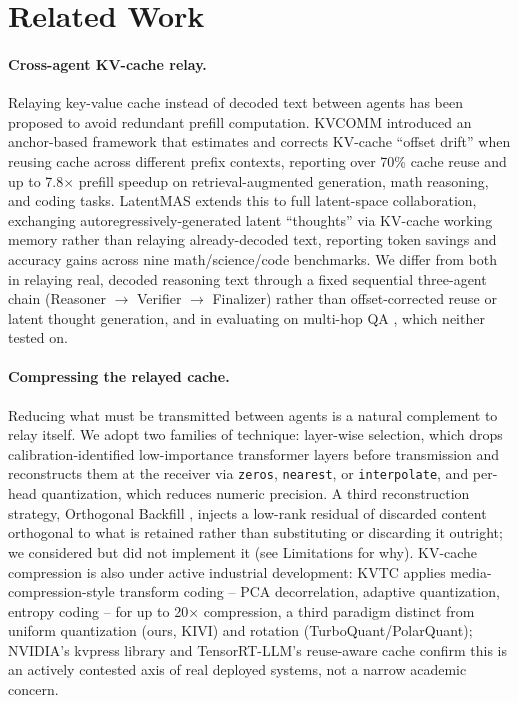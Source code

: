 \documentclass[11pt]{article}
\begin{document}
\section{Related Work}
\label{sec:related}

\paragraph{Cross-agent KV-cache relay.} Relaying key-value cache instead
of decoded text between agents has been proposed to avoid redundant
prefill computation. KVCOMM \citep{kvcomm2025} introduced an anchor-based
framework that estimates and corrects KV-cache ``offset drift'' when
reusing cache across different prefix contexts, reporting over 70\% cache
reuse and up to 7.8$\times$ prefill speedup on retrieval-augmented
generation, math reasoning, and coding tasks. LatentMAS
\citep{latentmas2026} extends this to full latent-space collaboration,
exchanging autoregressively-generated latent ``thoughts'' via KV-cache
working memory rather than relaying already-decoded text, reporting token
savings and accuracy gains across nine math/science/code benchmarks. We
differ from both in relaying real, decoded reasoning text through a fixed
sequential three-agent chain (Reasoner $\rightarrow$ Verifier
$\rightarrow$ Finalizer) rather than offset-corrected reuse or latent
thought generation, and in evaluating on multi-hop QA
\citep{hotpotqa2018}, which neither tested on.

\paragraph{Compressing the relayed cache.} Reducing what must be
transmitted between agents is a natural complement to relay itself. We
adopt two families of technique: layer-wise selection, which drops
calibration-identified low-importance transformer layers before
transmission and reconstructs them at the receiver via \texttt{zeros},
\texttt{nearest}, or \texttt{interpolate}, and per-head quantization,
which reduces numeric precision. A third reconstruction strategy,
Orthogonal Backfill \citep{orthobackfill2026}, injects a low-rank residual
of discarded content orthogonal to what is retained rather than
substituting or discarding it outright; we considered but did not
implement it (see Limitations for why). KV-cache compression is also
under active industrial development: KVTC \citep{kvtc2026} applies
media-compression-style transform coding -- PCA decorrelation, adaptive
quantization, entropy coding -- for up to 20$\times$ compression, a third
paradigm distinct from uniform quantization (ours, KIVI) and rotation
(TurboQuant/PolarQuant); NVIDIA's kvpress library and TensorRT-LLM's
reuse-aware cache confirm this is an actively contested axis of real
deployed systems, not a narrow academic concern.
\end{document}
